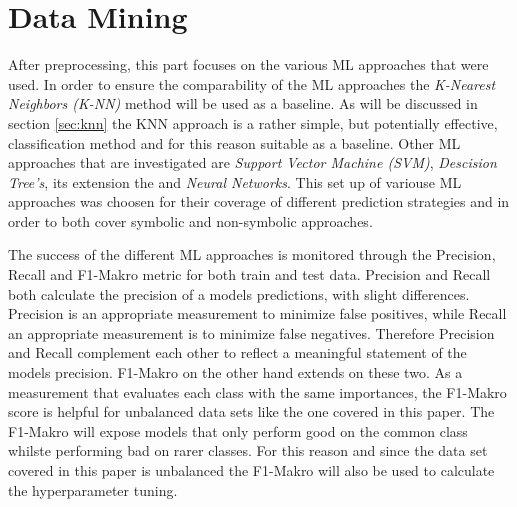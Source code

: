 \chapter{Data Mining}





After preprocessing, this part focuses on the various ML approaches that were used. In order to ensure the comparability of the ML approaches the \textit{K-Nearest Neighbors (K-NN)} method will be used as a baseline. As will be discussed in section \ref{sec:knn} the KNN approach is a rather simple, but potentially effective, classification method and for this reason suitable as a baseline. Other ML approaches that are investigated are \textit{Support Vector Machine (SVM)}, \textit{Descision Tree's}, its extension the  and \textit{Neural Networks}. This set up of variouse ML approaches was choosen for their coverage of different prediction strategies and in order to both cover symbolic and non-symbolic approaches.

The success of the different ML approaches is monitored through the Precision, Recall and F1-Makro metric for both train and test data. 
Precision and Recall both calculate the precision of a models predictions, with slight differences. Precision is an appropriate measurement to minimize false positives, while Recall an appropriate measurement is to minimize false negatives. Therefore Precision and Recall complement each other to reflect a meaningful statement of the models precision.\cite{Brownlee2020} F1-Makro on the other hand extends on these two. As a measurement that evaluates each class with the same importances, the F1-Makro score is helpful for unbalanced data sets like the one covered in this paper. The F1-Makro will expose models that only perform good on the common class whilste performing bad on rarer classes. For this reason and since the data set covered in this paper is unbalanced the F1-Makro will also be used to calculate the hyperparameter tuning.\cite{Peltarion2021}

